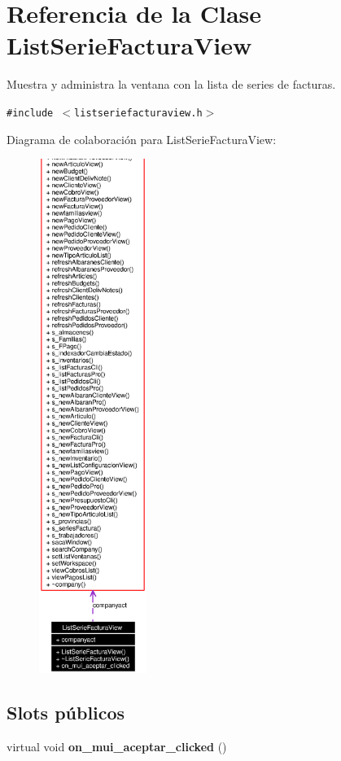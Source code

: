 \section{Referencia de la Clase List\-Serie\-Factura\-View}
\label{classListSerieFacturaView}
Muestra y administra la ventana con la lista de series de facturas.  


{\tt \#include $<$listseriefacturaview.h$>$}

Diagrama de colaboraci\'{o}n para List\-Serie\-Factura\-View:\begin{figure}[H]
\begin{center}
\leavevmode
\includegraphics[width=99pt]{classListSerieFacturaView__coll__graph}
\end{center}
\end{figure}
\subsection*{Slots p\'{u}blicos}
\begin{CompactItemize}
\item 
virtual void {\bf on\_\-mui\_\-aceptar\_\-clicked} ()\label{classListSerieFacturaView_i0}

\end{CompactItemize}
